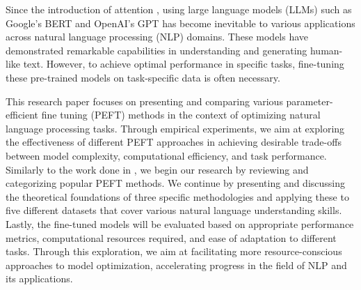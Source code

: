 Since the introduction of attention \cite{vaswani2017attention}, using large language models (LLMs) such as Google's BERT \cite{devlin2019bert} and OpenAI's GPT \cite{radford2018gpt} has become inevitable to various applications across natural language processing (NLP) domains. These models have demonstrated remarkable capabilities in understanding and generating human-like text. However, to achieve optimal performance in specific tasks, fine-tuning these pre-trained models on task-specific data is often necessary.

This research paper focuses on presenting and comparing various parameter-efficient fine tuning (PEFT) methods in the context of optimizing natural language processing tasks. Through empirical experiments, we aim at exploring the effectiveness of different PEFT approaches in achieving desirable trade-offs between model complexity, computational efficiency, and task performance. Similarly to the work done in \cite{xu2023parameterefficient}, we begin our research by reviewing and categorizing popular PEFT methods. We continue by presenting and discussing the theoretical foundations of three specific methodologies and applying these to five different datasets that cover various natural language understanding skills. Lastly, the fine-tuned models will be evaluated based on appropriate performance metrics, computational resources required, and ease of adaptation to different tasks. Through this exploration, we aim at facilitating more resource-conscious approaches to model optimization, accelerating progress in the field of NLP and its applications.